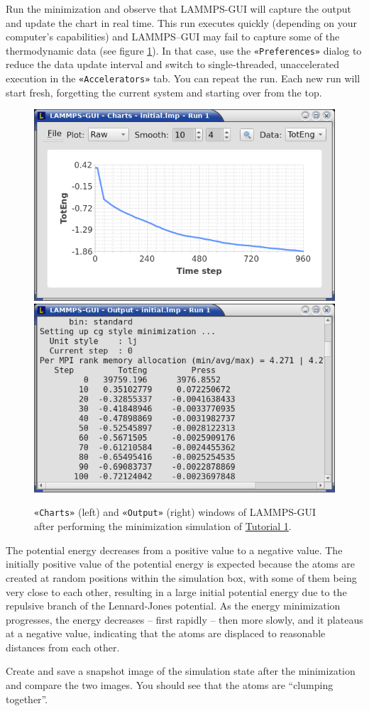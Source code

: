 \documentclass[9pt,tutorial]{livecoms}
\newcommand{\guicmd}[1]{\textcolor{command}{\texttt{«#1»}}} %
\begin{document}
Run the minimization and observe that LAMMPS-GUI will capture the output
and update the chart in real time.  This run executes quickly (depending
on your computer's capabilities) and LAMMPS--GUI may fail to capture some
of the thermodynamic data (see figure \ref{fig:chart-log}).  In that
case, use the \guicmd{Preferences} dialog to reduce the data update
interval and switch to single-threaded, unaccelerated execution in the
\guicmd{Accelerators} tab.  You can repeat the run.  Each new run will start
fresh, forgetting the current system and starting over from the top.

\begin{figure}
\centering
\includegraphics[width=0.49\linewidth]{chart-1}
\includegraphics[width=0.497\linewidth]{output-1}
\caption{\guicmd{Charts} (left) and \guicmd{Output} (right) windows of LAMMPS-GUI
  after performing the minimization simulation of \hyperref[lennard-jones-label]{Tutorial 1}.}
\label{fig:chart-log}
\end{figure}

The potential energy decreases from a positive value to a
negative value.  The initially positive value of the potential energy is
expected because the atoms are created at random positions within
the simulation box, with some of them being very close to each other,
resulting in a large initial potential energy due to the repulsive branch of the
Lennard-Jones potential.  As the energy minimization progresses, the
energy decreases -- first rapidly -- then more slowly, and it plateaus at
a negative value, indicating that the atoms are displaced to
reasonable distances from each other.

Create and save a snapshot image of the simulation state after the
minimization and compare the two images.  You should see that the atoms
are ``clumping together''.
\end{document}
